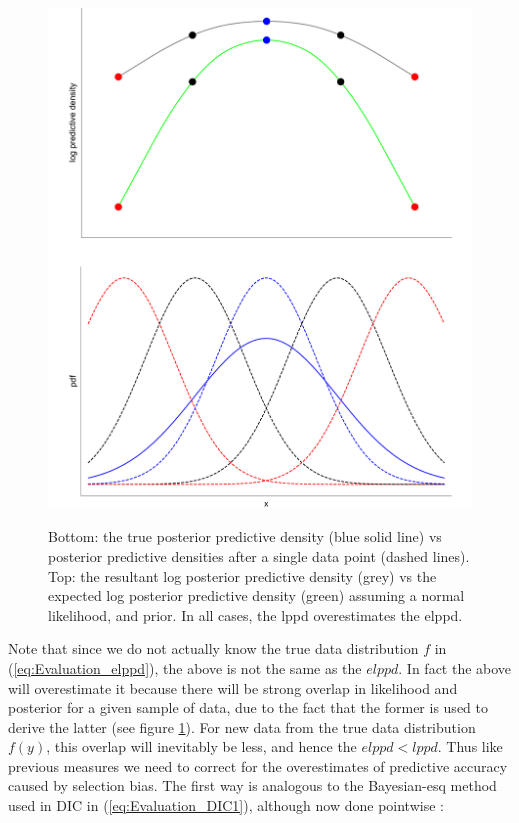 \documentclass[11pt,fullpage]{book}
\begin{document}
\begin{figure}
\centering
\scalebox{0.3} 
{\includegraphics{Evaluation_lppdOverconfidence.pdf}}
\caption{Bottom: the true posterior predictive density (blue solid line) vs posterior predictive densities after a single data point (dashed lines). Top: the resultant log posterior predictive density (grey) vs the expected log posterior predictive density (green) assuming a normal likelihood, and prior. In all cases, the lppd overestimates the elppd.}\label{fig:Evaluation_lppdOverconfidence}
\end{figure}

Note that since we do not actually know the true data distribution $f$ in (\ref{eq:Evaluation_elppd}), the above is not the same as the $elppd$. In fact the above will overestimate it because there will be strong overlap in likelihood and posterior for a given sample of data, due to the fact that the former is used to derive the latter (see figure \ref{fig:Evaluation_lppdOverconfidence}). For new data from the true data distribution $f(y)$, this overlap will inevitably be less, and hence the $elppd<lppd$. Thus like previous measures we need to correct for the overestimates of predictive accuracy caused by selection bias. The first way is analogous to the Bayesian-esq method used in DIC in (\ref{eq:Evaluation_DIC1}), although now done pointwise \cite{gelman2013bayesian}:
\end{document}
